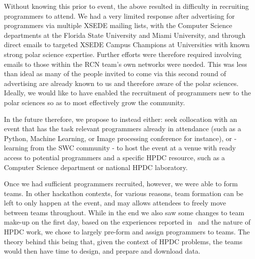 \documentclass[conference]{IEEEtran}
\begin{document}

Without knowing this prior to event, the above resulted in difficulty in recruiting programmers to attend.  We had a very limited response after advertising for programmers via multiple XSEDE mailing lists, with the Computer Science departments at the Florida State University and Miami University, and through direct emails to targeted XSEDE Campus Champions at Universities with known strong polar science expertise. Further efforts were therefore required involving emails to those within the RCN team's own networks were needed. This was less than ideal as many of the people invited to come via this second round of advertising are already known to us and therefore aware of the polar sciences. Ideally, we would like to have enabled the recruitment of programmers new to the polar sciences so as to most effectively grow the community.  

In the future therefore, we propose to instead either: seek collocation with an event that has the task relevant programmers already in attendance (such as a Python, Machine Learning, or Image processing conference for instance), or - learning from the SWC community - to host the event at a venue with ready access to potential programmers and a specific HPDC resource, such as a Computer Science department or national HPDC laboratory.

Once we had sufficient programmers recruited, however, we were able to form teams. In other hackathon contexts, for various reasons, team formation can be left to only happen at the event, and may allows attendees to freely move between teams throughout. While in the end we also saw some changes to team make-up on the first day, based on the experiences reported in~\cite{mattmann2015} and the nature of HPDC work, we chose to largely pre-form and assign programmers to teams.  The theory behind this being that, given the context of HPDC problems, the teams would then have time to design, and prepare and download data.
\end{document}

